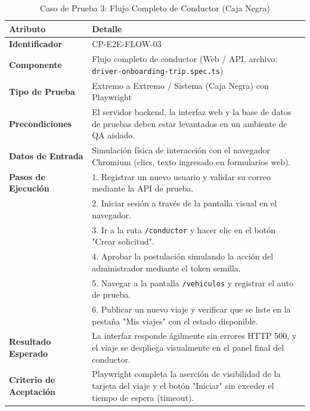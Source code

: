\documentclass{article}
\begin{document}
\begin{table}[H]
\centering
\small
\caption{Caso de Prueba 3: Flujo Completo de Conductor (Caja Negra)}
\begin{tabularx}{\linewidth}{p{4cm} X}
\toprule
\textbf{Atributo} & \textbf{Detalle} \\
\midrule
\textbf{Identificador} & CP-E2E-FLOW-03 \\
\textbf{Componente} & Flujo completo de conductor (Web / API, archivo: \texttt{driver-onboarding-trip.spec.ts}) \\
\textbf{Tipo de Prueba} & Extremo a Extremo / Sistema (Caja Negra) con Playwright \\
\textbf{Precondiciones} & El servidor backend, la interfaz web y la base de datos de pruebas deben estar levantados en un ambiente de QA aislado. \\
\textbf{Datos de Entrada} & Simulación física de interacción con el navegador Chromium (clics, texto ingresado en formularios web). \\
\textbf{Pasos de Ejecución} & 1. Registrar un nuevo usuario y validar su correo mediante la API de prueba.\\
& 2. Iniciar sesión a través de la pantalla visual en el navegador.\\
& 3. Ir a la ruta \texttt{/conductor} y hacer clic en el botón "Crear solicitud".\\
& 4. Aprobar la postulación simulando la acción del administrador mediante el token semilla.\\
& 5. Navegar a la pantalla \texttt{/vehiculos} y registrar el auto de prueba.\\
& 6. Publicar un nuevo viaje y verificar que se liste en la pestaña "Mis viajes" con el estado disponible.\\
\textbf{Resultado Esperado} & La interfaz responde ágilmente sin errores HTTP 500, y el viaje se despliega visualmente en el panel final del conductor. \\
\textbf{Criterio de Aceptación} & Playwright completa la aserción de visibilidad de la tarjeta del viaje y el botón "Iniciar" sin exceder el tiempo de espera (timeout). \\
\bottomrule
\end{tabularx}
\end{table}
\end{document}
